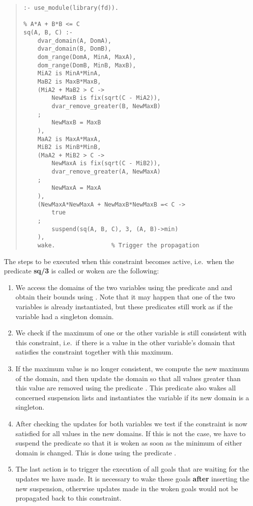 \begin{quote}
\begin{verbatim}
:- use_module(library(fd)).

% A*A + B*B <= C
sq(A, B, C) :-
    dvar_domain(A, DomA),
    dvar_domain(B, DomB),
    dom_range(DomA, MinA, MaxA),
    dom_range(DomB, MinB, MaxB),
    MiA2 is MinA*MinA,
    MaB2 is MaxB*MaxB,
    (MiA2 + MaB2 > C ->
        NewMaxB is fix(sqrt(C - MiA2)),
        dvar_remove_greater(B, NewMaxB)
    ;
        NewMaxB = MaxB
    ),
    MaA2 is MaxA*MaxA,
    MiB2 is MinB*MinB,
    (MaA2 + MiB2 > C ->
        NewMaxA is fix(sqrt(C - MiB2)),
        dvar_remove_greater(A, NewMaxA)
    ;
        NewMaxA = MaxA
    ),
    (NewMaxA*NewMaxA + NewMaxB*NewMaxB =< C ->
        true
    ;
        suspend(sq(A, B, C), 3, (A, B)->min)
    ),
    wake.                % Trigger the propagation
\end{verbatim}
\end{quote}

The steps to be executed when this constraint becomes active,
i.e.\ when the predicate {\bf sq/3} is called or woken
are the following:
\begin{enumerate}
\item We access the domains of the two variables
using the predicate  and
and obtain their bounds using .
Note that it may happen that one of the two variables is already instantiated,
but these predicates still work as if the variable had a singleton domain.

\item We check if the maximum of one or the other variable is still
consistent with this constraint, i.e.\ if there is a value
in the other variable's domain that satisfies the constraint
together with this maximum.

\item If the maximum value is no longer consistent, we compute
the new maximum of the domain, and then update the domain
so that all values greater than this value are removed
using the predicate .
This predicate also wakes all concerned suspension lists
and instantiates the variable if its new domain is a singleton.

\item After checking the updates for both variables we test
if the constraint is now satisfied for all values
in the new domains.
If this is not the case, we have to suspend the predicate
so that it is woken as soon as the minimum of either domain
is changed.
This is done using the predicate .

\item The last action is to trigger the execution of all goals that 
are waiting for
the updates we have made.
It is necessary to wake these goals {\bf after} inserting
the new suspension, otherwise updates made in the
woken goals would not be propagated back to this constraint.
\end{enumerate}

